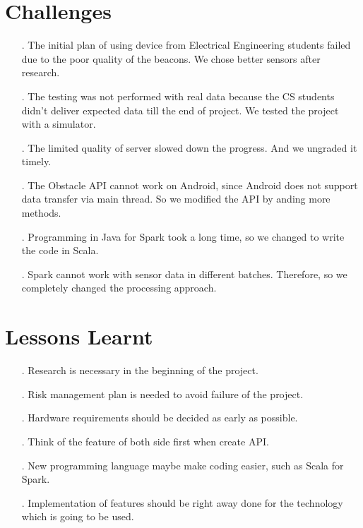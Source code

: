 \documentclass[prodmode,acmtosem]{acmsmall} %
\begin{document}
\section{Challenges}
\begin{itemize}
\item[.] The initial plan of using device from Electrical Engineering students failed due to the poor quality of the beacons. We chose better sensors after research.\\
\item[.] The testing was not performed with real data because the CS students didn't deliver expected data till the end of project. We tested the project with a simulator.\\
\item[.] The limited quality of server slowed down the progress. And we ungraded it timely.\\
\item[.] The Obstacle API cannot work on Android, since Android does not support data transfer via main thread. So we modified the API by anding more methods.\\
\item[.] Programming in Java for Spark took a long time, so we changed to write the code in Scala.\\
\item[.] Spark cannot work with sensor data in different batches. Therefore, so we completely changed the processing approach.\\
\end{itemize}


\section{Lessons Learnt}
\begin{itemize}
\item[.] Research is necessary in the beginning of the project.\\
\item[.] Risk management plan is needed to avoid failure of the project.\\
\item[.] Hardware requirements should be decided as early as possible.\\
\item[.] Think of the feature of both side first when create API.\\
\item[.] New programming language maybe make coding easier, such as Scala for Spark.\\
\item[.] Implementation of features should be right away done for the technology which is going to be used.\\
\end{itemize}
\end{document}
